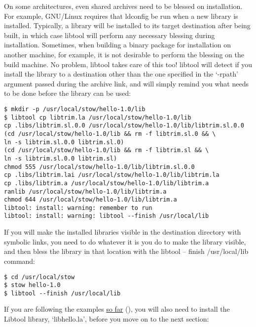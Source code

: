 On some architectures, even shared archives need to be blessed on installation. For example, GNU/Linux requires that ldconfig be run when a new library is installed. Typically, a library will be installed to its target destination after being built, in which case libtool will perform any necessary blessing during installation. Sometimes, when building a binary package for installation on another machine, for example, it is not desirable to perform the blessing on the build machine. No problem, libtool takes care of this too! libtool will detect if you install the library to a destination other than the one specified in the `-rpath' argument passed during the archive link, and will simply remind you what needs to be done before the library can be used: 

\begin{Verbatim}
$ mkdir -p /usr/local/stow/hello-1.0/lib
$ libtool cp libtrim.la /usr/local/stow/hello-1.0/lib
cp .libs/libtrim.sl.0.0 /usr/local/stow/hello-1.0/lib/libtrim.sl.0.0
(cd /usr/local/stow/hello-1.0/lib && rm -f libtrim.sl.0 && \
ln -s libtrim.sl.0.0 libtrim.sl.0)
(cd /usr/local/stow/hello-1.0/lib && rm -f libtrim.sl && \
ln -s libtrim.sl.0.0 libtrim.sl)
chmod 555 /usr/local/stow/hello-1.0/lib/libtrim.sl.0.0
cp .libs/libtrim.lai /usr/local/stow/hello-1.0/lib/libtrim.la
cp .libs/libtrim.a /usr/local/stow/hello-1.0/lib/libtrim.a
ranlib /usr/local/stow/hello-1.0/lib/libtrim.a
chmod 644 /usr/local/stow/hello-1.0/lib/libtrim.a
libtool: install: warning: remember to run
libtool: install: warning: libtool --finish /usr/local/lib
\end{Verbatim}

If you will make the installed libraries visible in the destination directory 
with symbolic links, you need to do whatever it is you do to make the library 
visible, and then bless the library in that location with the libtool --
finish /usr/local/lib command: 

\begin{Verbatim}[frame=single]
$ cd /usr/local/stow
$ stow hello-1.0
$ libtool --finish /usr/local/lib
\end{Verbatim}

If you are following the examples \underline{so far} ({\MaQ{}}),
you will also need to install the Libtool library, `libhello.la',
before you move on to the next section: 

